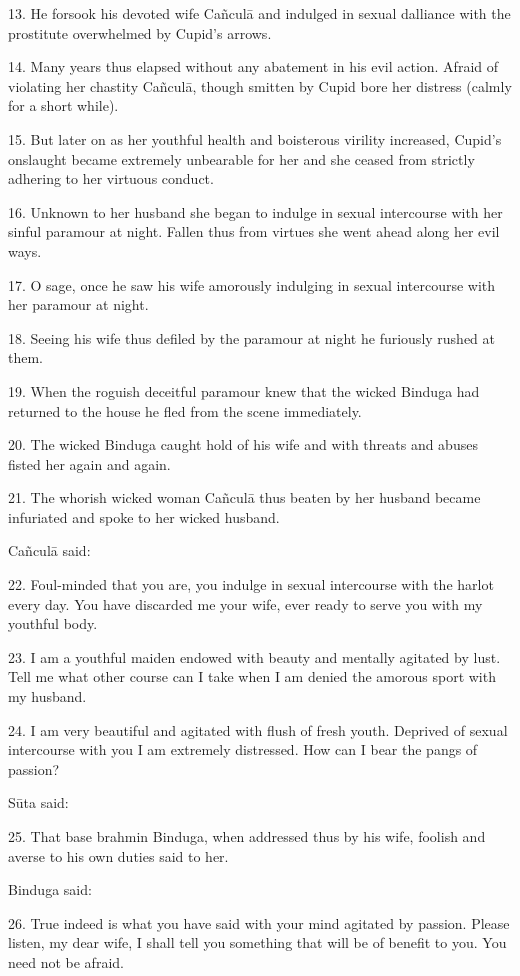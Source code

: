 13. He forsook his devoted wife Cañculā and indulged in sexual dalliance with
the prostitute overwhelmed by Cupid’s arrows.

14. Many years thus elapsed without any abatement in his evil action. Afraid of
violating her chastity Cañculā, though smitten by Cupid bore her distress
(calmly for a short while).

15. But later on as her youthful health and boisterous virility increased,
Cupid’s onslaught became extremely unbearable for her and she ceased from
strictly adhering to her virtuous conduct.

16. Unknown to her husband she began to indulge in sexual intercourse with her
sinful paramour at night. Fallen thus from  virtues she went ahead
along her evil ways.

17. O sage, once he saw his wife amorously indulging in sexual intercourse with
her paramour at night.

18. Seeing his wife thus defiled by the paramour at night he furiously rushed at
them.

19. When the roguish deceitful paramour knew that the wicked Binduga had
returned to the house he fled from the scene immediately.

20. The wicked Binduga caught hold of his wife and with threats and abuses
fisted her again and again.

21. The whorish wicked woman Cañculā thus beaten by her husband became
infuriated and spoke to her wicked husband.

Cañculā said:

22. Foul-minded that you are, you indulge in sexual intercourse with the harlot
every day. You have discarded me your wife, ever ready to serve you with my
youthful body.

23. I am a youthful maiden endowed with beauty and mentally agitated by lust.
Tell me what other course can I take when I am denied the amorous sport with my
husband.

24. I am very beautiful and agitated with flush of fresh youth. Deprived of
sexual intercourse with you I am extremely distressed. How can I bear the pangs
of passion?

Sūta said:

25. That base brahmin Binduga, when addressed thus by his wife, foolish and
averse to his own duties said to her.

Binduga said:

26. True indeed is what you have said with your mind agitated by passion. Please
listen, my dear wife, I shall tell you something that will be of benefit to you.
You need not be afraid.

